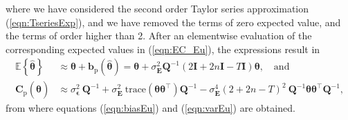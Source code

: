 where we have considered the second order Taylor series approximation (\ref{eqn:TseriesExp}), and we have removed the terms of zero expected value, and the terms of order higher than 2.
After an elementwise evaluation of the corresponding expected values in (\ref{eqn:EC_Eu}), the expressions result in 
\begin{equation} \begin{aligned} \mathbb{E} \left\{ \widehat{\bm{\theta}} \right\} & \approx \bm{\theta}  + \mathbf{b}_{\mathrm{p}} \left( \widehat{\bm{\theta}} \right) = \bm{\theta}  +  \sigma_{\mathbf{E}}^2 \mathbf{Q}^{-1} \left( 2\mathbf{I} + 2n\mathbf{I} - T \mathbf{I} \right) \bm{\theta} , \quad \text{and} \\ 
\mathbf{C}_{\mathrm{p}} \left( \widehat{\bm{\theta}} \right) & \approx \sigma_{\bm{\epsilon}}^2 \ \mathbf{Q}^{-1} + \sigma_{\mathbf{E}}^2 \ \mathrm{trace} \left( \bm{\theta} \bm{\theta}^\top \right) \mathbf{Q}^{-1} - \sigma_{\mathbf{E}}^4 \left( 2 + 2n - T \right)^2 \ \mathbf{Q}^{-1} \bm{\theta} \bm{\theta}^\top \mathbf{Q}^{-1} , \end{aligned} \end{equation}
from where equations (\ref{eqn:biasEu}) and (\ref{eqn:varEu}) are obtained.

